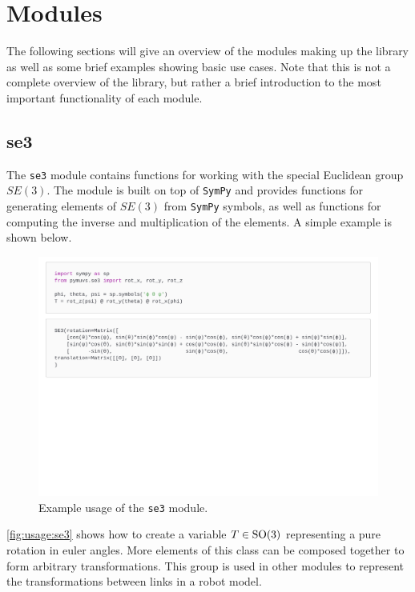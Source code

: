 \section{Modules}
The following sections will give an overview of the modules making up the
library as well as some brief examples showing basic use cases. Note that this
is not a complete overview of the library, but rather a brief introduction to
the most important functionality of each module.

\subsection{se3}
The \texttt{se3} module contains functions for working with the special Euclidean
group $SE(3)$. The module is built on top of \texttt{SymPy} and provides functions for
generating elements of $SE(3)$ from \texttt{SymPy} symbols, as well as functions
for computing the inverse and multiplication of the elements. A simple example
is shown below.

\begin{figure}[h]
    \centering
    \includegraphics[page=1,width=\linewidth,trim=0 11cm 0 0]{assets/se3.pdf}
    \caption{Example usage of the \texttt{se3} module.}
    \label{fig:usage:se3}
\end{figure}

\autoref{fig:usage:se3} shows how to create a variable $T \in \operatorname{SO}(3)$ representing
a pure rotation in euler angles. More elements of this class can be composed
together to form arbitrary transformations. This group is used in other modules
to represent the transformations between links in a robot model.

